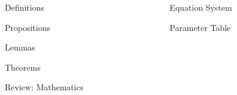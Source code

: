 \documentclass[final]{beamer}
\newlength{\onecolwid}
\theoremstyle{definition}
\begin{document}
\begin{frame}[t]
\begin{columns}[t]
\begin{column}{\onecolwid} %
\begin{alertblock}{Definitions}
\end{alertblock}
\begin{alertblock}{Propositions}
\end{alertblock}
\begin{alertblock}{Lemmas}
\end{alertblock}
\begin{alertblock}{Theorems}
\end{alertblock}
\begin{alertblock}{Review: Mathematics}
\end{alertblock}
\end{column}
\begin{column}{\onecolwid} %
\begin{alertblock}{Equation System}
\end{alertblock}
\begin{alertblock}{Parameter Table}
\end{alertblock}

\end{column}
\end{columns}
\end{frame}
\end{document}
